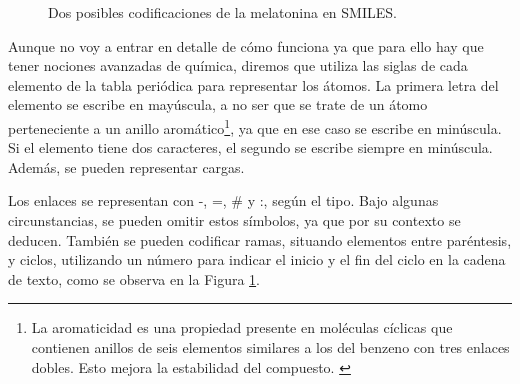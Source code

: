 \begin{figure}[H]
\centering
    \caption{Dos posibles codificaciones de la melatonina en SMILES. \cite{smiles_wikimedia}}
    \label{fig:ciclos-smiles}
\end{figure}

Aunque no voy a entrar en detalle de cómo funciona ya que para ello hay que tener nociones avanzadas de química, diremos que utiliza las siglas de cada elemento de la tabla periódica para representar los átomos. La primera letra del elemento se escribe en mayúscula, a no ser que se trate de un átomo perteneciente a un anillo aromático\footnote{La aromaticidad es una propiedad presente en moléculas cíclicas que contienen anillos de seis elementos similares a los del benzeno con tres enlaces dobles. Esto mejora la estabilidad del compuesto. \cite{aromaticidad, mcmurry2008quimica}}, ya que en ese caso se escribe en minúscula. Si el elemento tiene dos caracteres, el segundo se escribe siempre en minúscula. Además, se pueden representar cargas.

Los enlaces se representan con -, =, \# y :, según el tipo. Bajo algunas circunstancias, se pueden omitir estos símbolos, ya que por su contexto se deducen. También se pueden codificar ramas, situando elementos entre paréntesis, y ciclos, utilizando un número para indicar el inicio y el fin del ciclo en la cadena de texto, como se observa en la Figura \ref{fig:ciclos-smiles}. \cite{weininger1988smiles}

